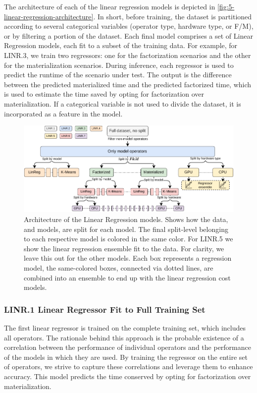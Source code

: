 The architecture of each of the linear regression models is depicted in \autoref{fig:5-linear-regression-architecture}. In short, before training, the dataset is partitioned according to several categorical variables (operator type, hardware type, or F/M), or by filtering a portion of the dataset. Each final model comprises a set of Linear Regression models, each fit to a subset of the training data. For example, for LINR.3, we train two regressors: one for the factorization scenarios and the other for the materialization scenarios. During inference, each regressor is used to predict the runtime of the scenario under test. The output is the difference between the predicted materialized time and the predicted factorized time, which is used to estimate the time saved by opting for factorization over materialization. If a categorical variable is not used to divide the dataset, it is incorporated as a feature in the model.

\begin{figure}[ht]
    \centering
    \includegraphics[width=\linewidth]{chapters/05_cost_estimation/figures/statistical-architecture.pdf}
    \caption[Linear Regression model Architecture]{Architecture of the Linear Regression models. Shows how the data, and models, are split for each model. The final split-level belonging to each respective model is colored in the same color. For LINR.5 we show the linear regression ensemble fit to the data. For clarity, we leave this out for the other models. Each box represents a regression model, the same-colored boxes, connected via dotted lines, are combined into an ensemble to end up with the linear regression cost models.}
    \label{fig:5-linear-regression-architecture}
\end{figure}

\subsubsection*{LINR.1 Linear Regressor Fit to Full Training Set}
The first linear regressor is trained on the complete training set, which includes all operators. The rationale behind this approach is the probable existence of a correlation between the performance of individual operators and the performance of the models in which they are used. By training the regressor on the entire set of operators, we strive to capture these correlations and leverage them to enhance accuracy. This model predicts the time conserved by opting for factorization over materialization.

